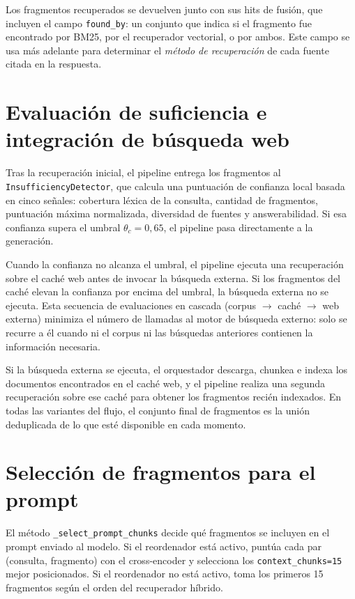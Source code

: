 \documentclass[11pt]{article}
\begin{document}
Los fragmentos recuperados se devuelven junto con sus hits de fusión, que incluyen el campo
\texttt{found\_by}: un conjunto que indica si el fragmento fue encontrado por BM25, por el
recuperador vectorial, o por ambos. Este campo se usa más adelante para determinar el
\emph{método de recuperación} de cada fuente citada en la respuesta.

\section{Evaluación de suficiencia e integración de búsqueda web}

Tras la recuperación inicial, el pipeline entrega los fragmentos al
\texttt{InsufficiencyDetector}, que calcula una puntuación de confianza local basada en cinco
señales: cobertura léxica de la consulta, cantidad de fragmentos, puntuación máxima
normalizada, diversidad de fuentes y answerabilidad. Si esa confianza supera el umbral
$\theta_c=0{,}65$, el pipeline pasa directamente a la generación.

Cuando la confianza no alcanza el umbral, el pipeline ejecuta una recuperación sobre el caché
web antes de invocar la búsqueda externa. Si los fragmentos del caché elevan la confianza por
encima del umbral, la búsqueda externa no se ejecuta. Esta secuencia de evaluaciones en cascada
(corpus $\to$ caché $\to$ web externa) minimiza el número de llamadas al motor de búsqueda
externo: solo se recurre a él cuando ni el corpus ni las búsquedas anteriores contienen la
información necesaria.

Si la búsqueda externa se ejecuta, el orquestador descarga, chunkea e indexa los documentos
encontrados en el caché web, y el pipeline realiza una segunda recuperación sobre ese caché
para obtener los fragmentos recién indexados. En todas las variantes del flujo, el conjunto
final de fragmentos es la unión deduplicada de lo que esté disponible en cada momento.

\section{Selección de fragmentos para el prompt}

El método \texttt{\_select\_prompt\_chunks} decide qué fragmentos se incluyen en el prompt
enviado al modelo. Si el reordenador está activo, puntúa cada par (consulta, fragmento) con el
cross-encoder y selecciona los \texttt{context\_chunks=15} mejor posicionados. Si el
reordenador no está activo, toma los primeros 15 fragmentos según el orden del recuperador
híbrido.
\end{document}
